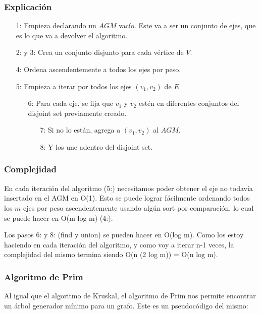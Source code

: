 \subsubsection*{Explicaci\'on}

\begin{enumerate}
\item [1:] Empieza declarando un $AGM$ vac\'io. Este va a ser un conjunto de ejes, que es lo que va a devolver el algoritmo.
\item [2: y 3:] Crea un conjunto disjunto para cada v\'ertice de $V$.
\item [4:] Ordena ascendentemente a todos los ejes por peso.
\item [5:] Empieza a iterar por todos los ejes $(v_1, v_2)$ de $E$
  \begin{enumerate}
  \item [6:] Para cada eje, se fija que $v_1$ y $v_2$ est\'en en diferentes conjuntos del disjoint set previamente creado.
    \begin{enumerate}
    \item [7:] Si no lo est\'an, agrega a $(v_1, v_2)$ al $AGM$.
    \item [8:] Y los une adentro del disjoint set.
    \end{enumerate}
  \end{enumerate}
\end{enumerate}

\subsubsection*{Complejidad}

En cada iteraci\'on del algoritmo (5:) necesitamos poder obtener el eje no todav\'ia insertado en el AGM en O(1). Esto se puede lograr f\'acilmente ordenando todos los $m$ ejes por peso ascendentemente usando alg\'un sort por comparaci\'on, lo cual se puede hacer en O(m log m) (4:).

Los pasos 6: y 8: (find y union) se pueden hacer en O(log m). Como los estoy haciendo en cada iteraci\'on del algoritmo, y como voy a iterar n-1 veces, la complejidad del mismo termina siendo O(n (2 log m)) = O(n log m).

\newpage
\subsubsection{Algoritmo de Prim}

Al igual que el algoritmo de Kruskal, el algoritmo de Prim nos permite encontrar un \'arbol generador m\'inimo para un grafo. Este es un pseudoc\'odigo del mismo:


